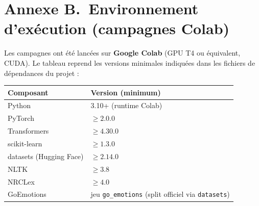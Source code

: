 \section*{Annexe B.~Environnement d'exécution (campagnes Colab)}

Les campagnes ont été lancées sur \textbf{Google Colab} (GPU T4 ou
équivalent, CUDA). Le tableau reprend les versions minimales indiquées
dans les fichiers de dépendances du projet :

{\small
\renewcommand{\arraystretch}{1.2}
\begin{tabular}{|l|l|}
\hline
\textbf{Composant} & \textbf{Version (minimum)} \\
\hline
Python & 3.10+ (runtime Colab) \\
\hline
PyTorch & $\geq 2.0.0$ \\
\hline
Transformers & $\geq 4.30.0$ \\
\hline
scikit-learn & $\geq 1.3.0$ \\
\hline
datasets (Hugging Face) & $\geq 2.14.0$ \\
\hline
NLTK & $\geq 3.8$ \\
\hline
NRCLex & $\geq 4.0$ \\
\hline
GoEmotions & jeu \texttt{go\_emotions} (split officiel via \texttt{datasets}) \\
\hline
\end{tabular}
}
